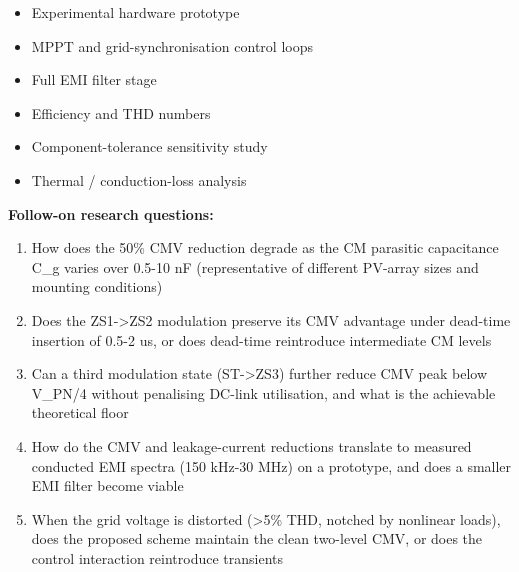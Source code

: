 \begin{itemize}[leftmargin=1.4em,itemsep=0.2em,topsep=0.2em]
\item Experimental hardware prototype
\item MPPT and grid-synchronisation control loops
\item Full EMI filter stage
\item Efficiency and THD numbers
\item Component-tolerance sensitivity study
\item Thermal / conduction-loss analysis
\end{itemize}\noindent\textbf{Follow-on research questions:}
\begin{enumerate}[leftmargin=1.6em,itemsep=0.2em,topsep=0.2em,label=Q\arabic*.]
\item How does the 50\% CMV reduction degrade as the CM parasitic capacitance C\_g varies over 0.5-10 nF (representative of different PV-array sizes and mounting conditions)
\item Does the ZS1-\textgreater{}ZS2 modulation preserve its CMV advantage under dead-time insertion of 0.5-2 us, or does dead-time reintroduce intermediate CM levels
\item Can a third modulation state (ST-\textgreater{}ZS3) further reduce CMV peak below V\_PN/4 without penalising DC-link utilisation, and what is the achievable theoretical floor
\item How do the CMV and leakage-current reductions translate to measured conducted EMI spectra (150 kHz-30 MHz) on a prototype, and does a smaller EMI filter become viable
\item When the grid voltage is distorted (\textgreater{}5\% THD, notched by nonlinear loads), does the proposed scheme maintain the clean two-level CMV, or does the control interaction reintroduce transients
\end{enumerate}

